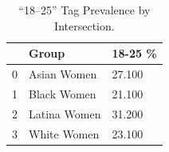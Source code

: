 \begin{table}[htbp]
\centering
\caption{“18–25” Tag Prevalence by Intersection.}
\label{tab:eda_age_tag_by_group}
\begin{tabular}{lll}
\toprule
 & Group & 18-25 \% \\
\midrule
0 & Asian Women & 27.100 \\
1 & Black Women & 21.100 \\
2 & Latina Women & 31.200 \\
3 & White Women & 23.100 \\
\bottomrule
\end{tabular}

\end{table}